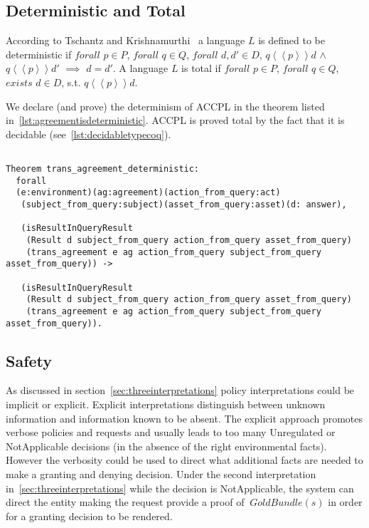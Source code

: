 \subsection{Deterministic and Total}

According to Tschantz and Krishnamurthi~\cite{Tschantz} a language $L$ is defined to be deterministic if $forall$ $p \in P$, $forall$ $q \in Q$, $forall$ $d, d' \in D$, $q \left\langle\left\langle p  \right\rangle\right\rangle d$ $\land$ $q \left\langle\left\langle p  \right\rangle\right\rangle d'$ $\implies$ $d = d'$. A language $L$ is total if $forall$ $p \in P$, $forall$ $q \in Q$, $exists$ $d \in D$, s.t. $q \left\langle\left\langle p  \right\rangle\right\rangle d$. 

We declare (and prove) the determinism of \ac{ACCPL} in the theorem listed in~\ref{lst:agreementisdeterministic}. \ac{ACCPL} is proved total by the fact that it is decidable (see~\ref{lst:decidabletypecoq}). 

\begin{lstlisting}

Theorem trans_agreement_deterministic:
  forall
  (e:environment)(ag:agreement)(action_from_query:act)
   (subject_from_query:subject)(asset_from_query:asset)(d: answer),

   (isResultInQueryResult 
    (Result d subject_from_query action_from_query asset_from_query)
    (trans_agreement e ag action_from_query subject_from_query asset_from_query)) ->

   (isResultInQueryResult 
    (Result d subject_from_query action_from_query asset_from_query)
    (trans_agreement e ag action_from_query subject_from_query asset_from_query)).
\end{lstlisting}


\subsection{Safety}

As discussed in section~\ref{sec:threeinterpretations} policy interpretations could be implicit or explicit. Explicit interpretations distinguish between unknown information and information known to be absent. The explicit approach promotes verbose policies and requests and usually leads to too many Unregulated or NotApplicable decisions (in the absence of the right environmental facts). However the verbosity could be used to direct what additional facts are needed to make a granting and denying decision. Under the second interpretation in~\ref{sec:threeinterpretations} while the decision is NotApplicable, the system can direct the entity making the request provide a proof of $~GoldBundle(s)$ in order for a granting decision to be rendered. 

